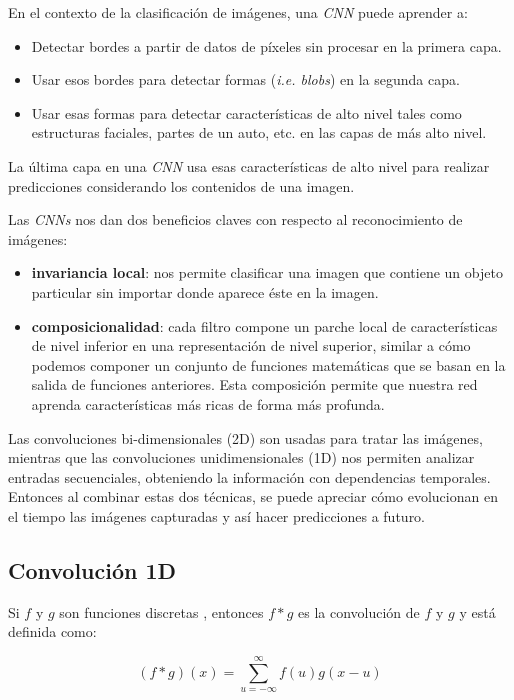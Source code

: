 \documentclass[a4paper,12pt]{article}
\begin{document}
En el contexto de la clasificación de imágenes, una \textit{CNN} puede aprender a:
\begin{itemize}
	\item Detectar bordes a partir de datos de píxeles sin procesar en la primera capa.
	\item Usar esos bordes para detectar formas (\textit{i.e. blobs}) en la segunda capa.
	\item Usar esas formas para detectar características de alto nivel tales como estructuras faciales, partes de un auto, etc. en las capas de más alto nivel.
\end{itemize}

La última capa en una \textit{CNN} usa esas características de alto nivel para realizar predicciones considerando los contenidos de una imagen.

Las \textit{CNNs} nos dan dos beneficios claves con respecto al reconocimiento de imágenes:
\begin{itemize}
	\item \textbf{invariancia local}: nos permite clasificar una imagen que contiene un objeto particular sin importar donde aparece éste en la imagen.
	\item \textbf{composicionalidad}: cada filtro compone un parche local de características de nivel inferior en una representación de nivel superior, similar a cómo podemos componer un conjunto de funciones matemáticas que se basan en la salida de funciones anteriores. Esta composición permite que nuestra red aprenda características más ricas de forma más profunda.

\end{itemize}

Las convoluciones bi-dimensionales (2D) son usadas para tratar las imágenes, mientras que las convoluciones unidimensionales (1D) nos permiten analizar entradas secuenciales, obteniendo la información con dependencias temporales. Entonces al combinar estas dos técnicas, se puede apreciar cómo evolucionan en el tiempo las imágenes capturadas y así hacer predicciones a futuro.

\subsection{Convolución 1D}
Si $f$ y $g$ son funciones discretas \citep{keller}, entonces $f * g$ es la convolución de $f$ y $g$ y está definida como:

$$(f*g)(x)=\sum_{u=-\infty}^{\infty} f(u)g(x-u)$$
\end{document}
